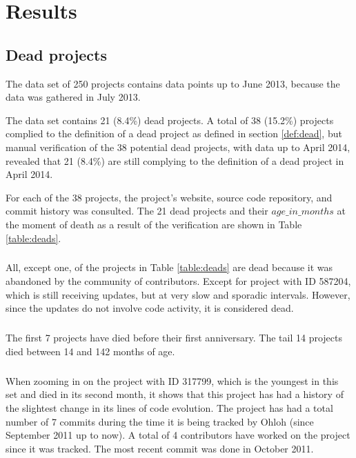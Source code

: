 \chapter{Results}
\label{results}

\section{Dead projects}
\label{section:deads}
The data set of 250 projects contains data points up to June 2013, because the
data was gathered in July 2013.

The data set contains 21 (8.4\%) dead projects. A total of 38 (15.2\%) projects
complied to the definition of a dead project as defined in section
\ref{def:dead}, but manual verification of the 38 potential dead projects, with
data up to April 2014, revealed that 21 (8.4\%) are still complying to the
definition of a dead project in April 2014.

For each of the 38 projects, the project's website, source code repository, and
commit history was consulted. The 21 dead projects and their $age\_in\_months$
at the moment of death as a result of the verification are shown in Table
\ref{table:deads}.



\paragraph{}
All, except one, of the projects in Table \ref{table:deads} are dead because it
was abandoned by the community of contributors. Except for project with ID
587204, which is still receiving updates, but at very slow and sporadic
intervals. However, since the updates do not involve code activity, it is
considered dead.

\paragraph{}
The first 7 projects have died before their first anniversary. The tail 14
projects died between 14 and 142 months of age.

\paragraph{}
When zooming in on the project with ID 317799, which is the youngest in this set
and died in its second month, it shows that this project has had a history of
the slightest change in its lines of code evolution. The project has had a total
number of 7 commits during the time it is being tracked by Ohloh (since
September 2011 up to now). A total of 4 contributors have worked on the project
since it was tracked. The most recent commit was done in October 2011.

